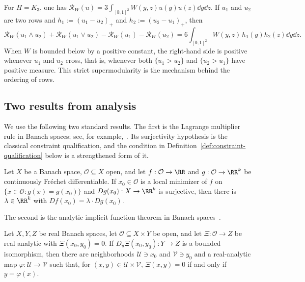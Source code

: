 \begin{expl}\label{expl:triangle-rooted}
For $H=K_3$, one has
$\mathcal R_W(u)=3\int_{[0,1]^2}W(y,z)u(y)u(z)\dd y\dd z$.  If $u_1$ and $u_2$ are
two rows and $h_1:=(u_1-u_2)_+$ and $h_2:=(u_2-u_1)_+$, then
\[
  \mathcal R_W(u_1\wedge u_2)+\mathcal R_W(u_1\vee u_2)
  -\mathcal R_W(u_1)-\mathcal R_W(u_2)
  =6\int_{[0,1]^2}W(y,z)\,h_1(y)h_2(z)\dd y\dd z.
\]
When $W$ is bounded below by a positive constant, the right-hand side is
positive whenever $u_1$ and $u_2$ cross, that is, whenever both
$\{u_1>u_2\}$ and $\{u_2>u_1\}$ have positive measure.  This strict
supermodularity is the mechanism behind the ordering of rows.
\end{expl}

\subsection{Two results from analysis}

We use the following two standard results.  The first is the Lagrange
multiplier rule in Banach spaces; see, for example,~\cite{Zeidler1995}.  Its
surjectivity hypothesis is the classical constraint qualification, and the
condition in Definition~\ref{def:constraint-qualification} below is a
strengthened form of it.

\begin{lemma}\label{lem:lagrange}
Let $X$ be a Banach space, $\mathcal O\subseteq X$ open, and let
$f:\mathcal O\to\RR$ and $g:\mathcal O\to\RR^k$ be continuously Fr\'echet
differentiable.  If $x_0\in\mathcal O$ is a local minimizer of $f$ on
$\{x\in\mathcal O:g(x)=g(x_0)\}$ and $Dg(x_0):X\to\RR^k$ is surjective, then
there is $\lambda\in\RR^k$ with $Df(x_0)=\lambda\cdot Dg(x_0)$.
\end{lemma}

The second is the analytic implicit function theorem in Banach
spaces~\cite{Whittlesey1965}.

\begin{lemma}\label{lem:analytic-ift}
Let $X,Y,Z$ be real Banach spaces, let $\mathcal O\subseteq X\times Y$ be
open, and let $\Xi:\mathcal O\to Z$ be real-analytic with
$\Xi(x_0,y_0)=0$.  If $D_y\Xi(x_0,y_0):Y\to Z$ is a bounded isomorphism,
then there are neighborhoods $\mathcal U\ni x_0$ and $\mathcal V\ni y_0$ and a
real-analytic map $\varphi:\mathcal U\to\mathcal V$ such that, for
$(x,y)\in\mathcal U\times\mathcal V$, $\Xi(x,y)=0$ if and only if
$y=\varphi(x)$.
\end{lemma}
